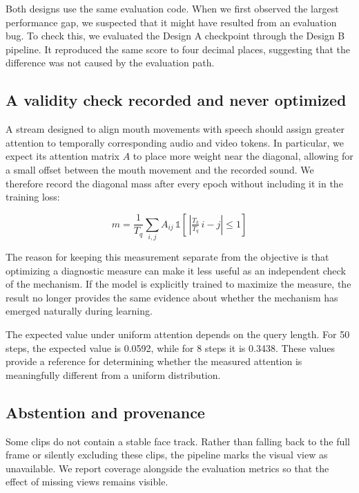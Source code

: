 \documentclass[conference]{IEEEtran}
\begin{document}
Both designs use the same evaluation code. When we first observed the largest
performance gap, we suspected that it might have resulted from an evaluation
bug. To check this, we evaluated the Design A checkpoint through the Design B
pipeline. It reproduced the same score to four decimal places, suggesting
that the difference was not caused by the evaluation path.

\subsection{A validity check recorded and never optimized}

A stream designed to align mouth movements with speech should assign greater
attention to temporally corresponding audio and video tokens. In particular,
we expect its attention matrix $A$ to place more weight near the diagonal,
allowing for a small offset between the mouth movement and the recorded sound.
We therefore record the diagonal mass after every epoch without including it
in the training loss:

\begin{equation}
m = \frac{1}{T_q}\sum_{i,j} A_{ij}\,\mathbb{1}\!\left[\,\left|\tfrac{T_k}{T_q}\,i - j\right| \le 1\right]
\end{equation}

The reason for keeping this measurement separate from the objective is that
optimizing a diagnostic measure can make it less useful as an independent
check of the mechanism. If the model is explicitly trained to maximize the
measure, the result no longer provides the same evidence about whether the
mechanism has emerged naturally during learning.

The expected value under uniform attention depends on the query length. For
50 steps, the expected value is 0.0592, while for 8 steps it is 0.3438.
These values provide a reference for determining whether the measured
attention is meaningfully different from a uniform distribution.

\subsection{Abstention and provenance}

Some clips do not contain a stable face track. Rather than falling back to
the full frame or silently excluding these clips, the pipeline marks the
visual view as unavailable. We report coverage alongside the evaluation
metrics so that the effect of missing views remains visible.
\end{document}
